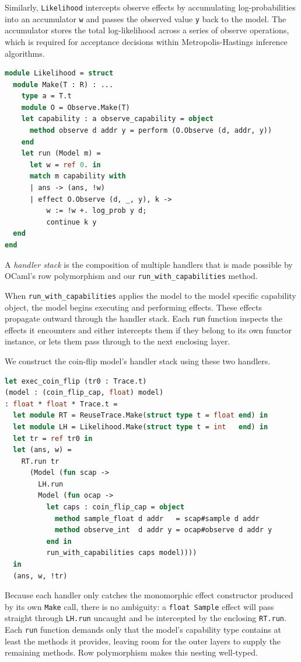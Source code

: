 \documentclass[logo,bsc,singlespacing,parskip,online]{infthesis}
\begin{document}
Similarly, \texttt{Likelihood} intercepts observe effects by accumulating log-probabilities into an accumulator \texttt{w} and passes the observed value \texttt{y} back to the model. The accumulator stores the total log-likelihood across a series of observe operations, which is required for acceptance decisions within Metropolis-Hastings inference algorithms.

\begin{lstlisting}[language=OCaml]
module Likelihood = struct
  module Make(T : R) : ...
    type a = T.t
    module O = Observe.Make(T)
    let capability : a observe_capability = object
      method observe d addr y = perform (O.Observe (d, addr, y))
    end
    let run (Model m) =
      let w = ref 0. in
      match m capability with
      | ans -> (ans, !w)
      | effect O.Observe (d, _, y), k ->
          w := !w +. log_prob y d;
          continue k y
  end
end
\end{lstlisting}

A \textit{handler stack} is the composition of multiple handlers that is made possible by OCaml's row polymorphism and our \texttt{run\_with\_capabilities} method.

When \texttt{run\_with\_capabilities} applies the model to the model specific capability object, the model begins executing and performing effects. These effects propagate outward through the handler stack. Each \texttt{run} function inspects the effects it encounters and either intercepts them if they belong to its own functor instance, or lets them pass through to the next enclosing layer.

We construct the coin-flip model's handler stack using these two handlers. 

\begin{lstlisting}[language=OCaml]
let exec_coin_flip (tr0 : Trace.t)
(model : (coin_flip_cap, float) model)
: float * float * Trace.t =
  let module RT = ReuseTrace.Make(struct type t = float end) in
  let module LH = Likelihood.Make(struct type t = int   end) in
  let tr = ref tr0 in
  let (ans, w) =
    RT.run tr
      (Model (fun scap ->
        LH.run
        Model (fun ocap ->
          let caps : coin_flip_cap = object
            method sample_float d addr   = scap#sample d addr
            method observe_int  d addr y = ocap#observe d addr y
          end in
          run_with_capabilities caps model))))
  in
  (ans, w, !tr)
\end{lstlisting}

Because each handler only catches the monomorphic effect constructor produced by its own \texttt{Make} call, there is no ambiguity: a \texttt{float Sample} effect will pass straight through \texttt{LH.run} uncaught and be intercepted by the enclosing \texttt{RT.run}. Each \texttt{run} function demands only that the model's capability type contains at least the methods it provides, leaving room for the outer layers to supply the remaining methods. Row polymorphism makes this nesting well-typed.
\end{document}
